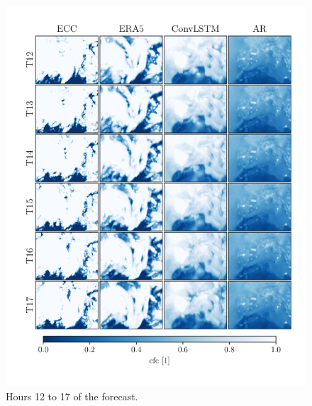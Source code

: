\begin{figure}[ht]
    \centering
    \includegraphics{python_figs/comparing_seq_part_3_of4_jan2.png}
    \caption{Hours 12 to 17 of the forecast.}
    \label{fig:part3/4}
\end{figure}
